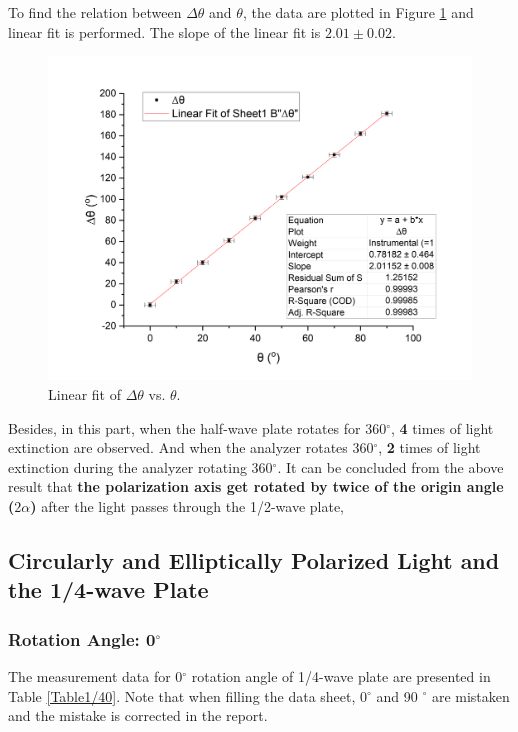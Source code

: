 \documentclass{article}
\begin{document}
To find the relation between $\Delta\theta$ and $\theta$, the data are plotted in Figure \ref{Figtheta} and linear fit is performed. The slope of the linear fit is $2.01 \pm 0.02$.

\begin{figure}[H]\centering
\includegraphics[scale=0.5]{2.png}
\caption{Linear fit of $\Delta\theta$ vs. $\theta$.}\label{Figtheta}
\end{figure}

Besides, in this part, when the half-wave plate rotates for 360$^\circ$, \textbf{4} times of light extinction are observed. And when the analyzer rotates 360$^\circ$, \textbf{2} times of light extinction during the analyzer rotating 360$^\circ$. It can be concluded from the above result that \textbf{the polarization axis get rotated by twice of the origin angle ($2\alpha$)} after the light passes through the 1/2-wave plate,


\subsection{Circularly and Elliptically Polarized Light and the 1/4-wave Plate}

\subsubsection{Rotation Angle: 0$^\circ$} \label{sec:0degree}

The measurement data for 0$^\circ$ rotation angle of 1/4-wave plate are presented in Table \ref{Table1/40}. Note that when filling the data sheet, 0$^\circ$ and 90 $^\circ$ are mistaken and the mistake is corrected in the report.
\end{document}
